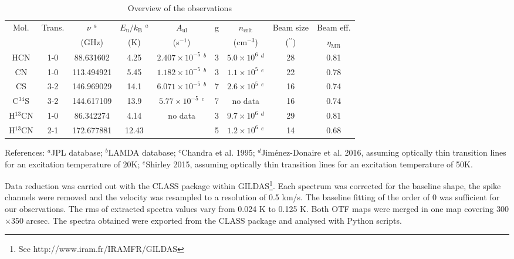 \documentclass{aa}
\begin{document}
\begin{table*}
\caption{Overview of the observations}             %
\label{table:1}      %
\centering                          %
\begin{tabular}{c c c c c c c c c}        %
\hline\hline                 %
Mol. & Trans. & $\nu$ $^a$ & $E_\mathrm{u}/k_\mathrm{B}$ $^a$&  $A_\mathrm{ul}$ & g & $n_\mathrm{crit}$ &Beam size & Beam eff.\\
 & & (GHz) & (K) & (s$^{-1}$) & & (cm$^{-3}$) & ($^{\prime\prime}$) & $\eta_\mathrm{MB}$\\
\hline                        %
HCN & 1-0 & 88.631602 & 4.25 & $2.407 \times 10^{-5}$ $^b$ & 3 & $5.0 \times 10^{6}$ $^d$ & 28 & 0.81\\
CN & 1-0 & 113.494921 & 5.45 & $1.182 \times 10^{-5}$ $^b$& 3 & $1.1 \times 10^{5}$ $^e$& 22 & 0.78\\
CS & 3-2 & 146.969029 & 14.1 & $6.071 \times 10^{-5}$ $^b$& 7 &$2.6 \times 10^{5}$ $^e$ & 16 & 0.74\\
C$^{34}$S & 3-2 & 144.617109 & 13.9 & $5.77 \times 10^{-5}$ $^c$ & 7 & no data & 16 & 0.74\\
H$^{13}$CN & 1-0 & 86.342274 & 4.14 & \multirow{2}{*}{no data} & 3 & $9.7 \times 10^{6}$ $^d$ & 29 & 0.81\\
H$^{13}$CN & 2-1 & 172.677881 & 12.43 & & 5 & $1.2 \times 10^{6}$ $^e$ & 14 & 0.68\\
\hline                                   
\end{tabular}
\begin{flushleft}
References: 
$^a$JPL database; 
$^b$LAMDA database;
$^c$Chandra et al. 1995;
$^d$Jim\'enez-Donaire et al. 2016, assuming optically thin transition lines for an excitation temperature of 20K;
$^e$Shirley 2015, assuming optically thin transition lines for an excitation temperature of 50K.

\end{flushleft}
\end{table*}

Data reduction was carried out with the CLASS package within GILDAS\footnote{See http://www.iram.fr/IRAMFR/GILDAS}. Each spectrum was corrected for the baseline shape, the spike channels were removed and the velocity was resampled to a resolution of 0.5 km/s. The baseline fitting of the order of 0 was sufficient for our observations. The rms of extracted spectra values vary from 0.024 K to 0.125 K. Both OTF maps were merged in one map covering 300$\times$350 arcsec. The spectra obtained were exported from the CLASS package and analysed with Python scripts. 
\end{document}
